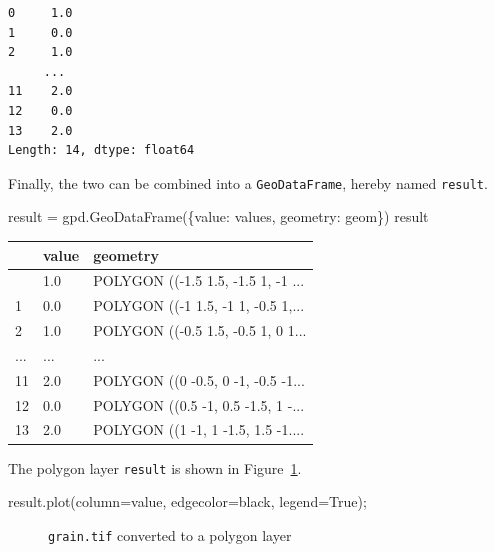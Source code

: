\documentclass[
  letterpaper,
]{krantz}
\newenvironment{Shaded}{\begin{snugshade}}{\end{snugshade}}
\newcommand{\NormalTok}[1]{\textcolor[rgb]{0.00,0.23,0.31}{#1}}
\newcommand{\OperatorTok}[1]{\textcolor[rgb]{0.37,0.37,0.37}{#1}}
\newcommand{\StringTok}[1]{\textcolor[rgb]{0.13,0.47,0.30}{#1}}
\newcommand{\VariableTok}[1]{\textcolor[rgb]{0.07,0.07,0.07}{#1}}
\begin{document}
\begin{verbatim}
0     1.0
1     0.0
2     1.0
     ... 
11    2.0
12    0.0
13    2.0
Length: 14, dtype: float64
\end{verbatim}

Finally, the two can be combined into a \texttt{GeoDataFrame}, hereby
named \texttt{result}.

\begin{Shaded}
\begin{Highlighting}[]
\NormalTok{result }\OperatorTok{=}\NormalTok{ gpd.GeoDataFrame(\{}\StringTok{\textquotesingle{}value\textquotesingle{}}\NormalTok{: values, }\StringTok{\textquotesingle{}geometry\textquotesingle{}}\NormalTok{: geom\})}
\NormalTok{result}
\end{Highlighting}
\end{Shaded}

\begin{longtable}[]{@{}lll@{}}
\toprule\noalign{}
& value & geometry \\
\midrule\noalign{}
\endhead
\bottomrule\noalign{}
\endlastfoot
0 & 1.0 & POLYGON ((-1.5 1.5, -1.5 1, -1 ... \\
1 & 0.0 & POLYGON ((-1 1.5, -1 1, -0.5 1,... \\
2 & 1.0 & POLYGON ((-0.5 1.5, -0.5 1, 0 1... \\
... & ... & ... \\
11 & 2.0 & POLYGON ((0 -0.5, 0 -1, -0.5 -1... \\
12 & 0.0 & POLYGON ((0.5 -1, 0.5 -1.5, 1 -... \\
13 & 2.0 & POLYGON ((1 -1, 1 -1.5, 1.5 -1.... \\
\end{longtable}

The polygon layer \texttt{result} is shown in
Figure~\ref{fig-raster-to-polygons}.

\begin{Shaded}
\begin{Highlighting}[]
\NormalTok{result.plot(column}\OperatorTok{=}\StringTok{\textquotesingle{}value\textquotesingle{}}\NormalTok{, edgecolor}\OperatorTok{=}\StringTok{\textquotesingle{}black\textquotesingle{}}\NormalTok{, legend}\OperatorTok{=}\VariableTok{True}\NormalTok{)}\OperatorTok{;}
\end{Highlighting}
\end{Shaded}

\begin{figure}[H]


\caption{\label{fig-raster-to-polygons}\texttt{grain.tif} converted to a
polygon layer}

\end{figure}%
\end{document}

